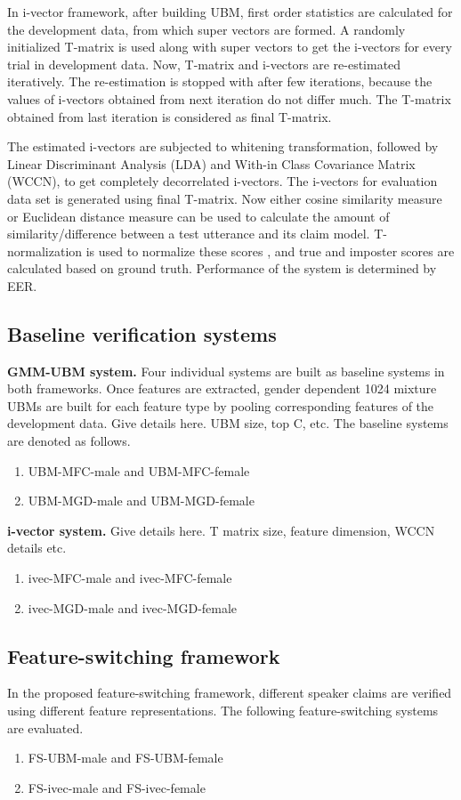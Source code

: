 \documentclass{article}
\begin{document}
In i-vector framework, after building UBM, first order statistics are calculated for the development data, from which super vectors are formed. A randomly  initialized T-matrix is used along with super vectors to get the i-vectors for every trial in development data. Now, T-matrix and i-vectors are re-estimated iteratively. The re-estimation is stopped with after few iterations, because the values of i-vectors obtained from next iteration do not differ much. The T-matrix obtained from last iteration is considered as final T-matrix.

The estimated i-vectors are subjected to whitening transformation, followed by Linear Discriminant Analysis (LDA) and With-in Class Covariance Matrix (WCCN), to get completely decorrelated i-vectors. The i-vectors for evaluation data set is generated using final T-matrix. Now either cosine similarity measure or Euclidean distance measure can be used to calculate the amount of similarity/difference between a test utterance and its claim model. T-normalization is used to normalize these scores \cite{tnorm}, and true and imposter scores are calculated based on ground truth. Performance of the system is determined by EER.

\subsection{Baseline verification systems}
\textbf{GMM-UBM system.} 
Four individual systems are built as baseline systems in both frameworks.  Once features are extracted, gender dependent 1024 mixture UBMs are built for each feature type by pooling corresponding features of the development data. 
Give details here. UBM size, top C, etc.
The baseline systems are denoted as follows.
\begin{enumerate}
\item UBM-MFC-male and UBM-MFC-female
\item UBM-MGD-male and UBM-MGD-female
\end{enumerate}

\textbf{i-vector system.} Give details here. T matrix size, feature dimension,
WCCN details etc. 
\begin{enumerate}
\item ivec-MFC-male and ivec-MFC-female
\item ivec-MGD-male and ivec-MGD-female
\end{enumerate}

\subsection{Feature-switching framework}
In the proposed feature-switching framework, different speaker claims are
verified using different feature representations. The following
feature-switching systems are evaluated.
\begin{enumerate}
\item FS-UBM-male and FS-UBM-female
\item FS-ivec-male and FS-ivec-female
\end{enumerate}
\end{document}
